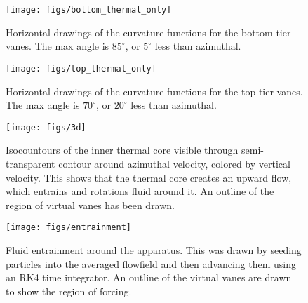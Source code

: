 \begin{figure}[htb]
\centering
\begin{minipage}{0.45\textwidth}
\centering
 \texttt{[image: figs/bottom\_thermal\_only]}
 \caption{Horizontal drawings of the curvature functions for the bottom tier
 vanes. The max angle is $85^{\circ}$, or $5^{\circ}$ less than azimuthal.}
 \label{fig:thermal_vane_bottom}  
\end{minipage}\hfill
\begin{minipage}{0.45\textwidth}
\centering
\texttt{[image: figs/top\_thermal\_only]}
\caption{Horizontal drawings of the curvature functions for the top tier
 vanes. The max angle is $70^{\circ}$, or $20^{\circ}$ less than
 azimuthal.} 
 \label{fig:thermal_vane_top}  
\end{minipage}
\end{figure}

\begin{figure}[htb]
\centering
\begin{minipage}{0.45\textwidth}
\centering
 \texttt{[image: figs/3d]}
 \caption{Isocountours of the inner thermal core
  visible through semi-transparent contour around azimuthal velocity,
  colored by vertical velocity. This shows that the thermal core creates
 an upward flow, which entrains and rotations fluid around it. An
 outline of the region of virtual vanes has been drawn.}
 \label{fig:thermal}  
\end{minipage}\hfill
\begin{minipage}{0.45\textwidth}
\centering
\texttt{[image: figs/entrainment]}
\caption{Fluid entrainment around the apparatus. This was drawn by
 seeding particles into the averaged flowfield and then advancing them
 using an RK4 time integrator. An outline of the
  virtual vanes are drawn to show the region of forcing.}
 \label{fig:entrain}  
\end{minipage}
\end{figure}




